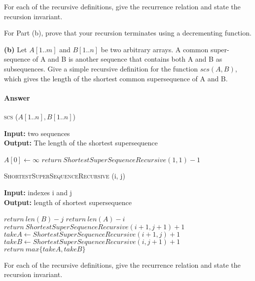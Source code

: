 \documentclass{article}
\begin{document}
For each of the recursive definitions, give the recurrence
relation and state the recursion invariant.

For Part (b), prove that your recursion terminates
using a decrementing function.

{\bf (b)} Let $A[1.. m]$ and $B[1.. n]$ be two arbitrary arrays. A common super-
sequence of A and B is another sequence that contains both A and B
as subsequences. Give a simple recursive definition for the function
$scs(A, B)$, which gives the length of the shortest common supersequence
of A and B.

\paragraph{Answer}

\begin{algorithm} \caption{\textsc{scs} ($A[1..n], B[1..n]$)}\label{alg:seb}
    {\bf Input:} two sequences\\
    {\bf Output:} The length of the shortest supersequence
    \begin{algorithmic}[1]
        \State$A[0] \gets \infty$
        \State$return\ ShortestSuperSequenceRecursive(1, 1) -1$
    \end{algorithmic}
\end{algorithm}

\begin{algorithm} \caption{\textsc{ShortestSuperSequenceRecursive} (i, j)}\label{alg:seb}
    {\bf Input:} indexes i and j\\
    {\bf Output:} length of shortest supersequence
    \begin{algorithmic}[1]
            \State$return\ len(B) - j$
            \State$return\ len(A) - i$
            \State$return\ ShortestSuperSequenceRecursive(i+1, j+1) +1$
        \EndIf{}
        \State$takeA \gets ShortestSuperSequenceRecursive(i+1, j) +1$
        \State$takeB \gets ShortestSuperSequenceRecursive(i, j+1) +1$
        \State$return\ max\{takeA, takeB\}$
    \end{algorithmic}
\end{algorithm}

\todo{}



For each of the recursive definitions, give the recurrence
relation and state the recursion invariant.
\end{document}

